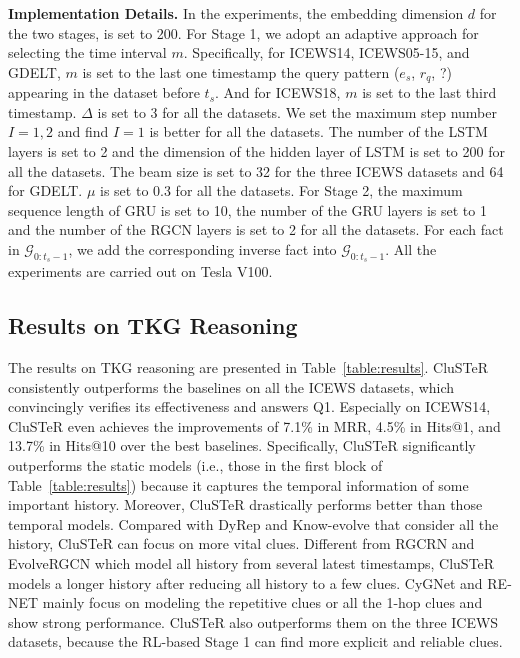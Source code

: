 \documentclass[11pt,a4paper]{article}
\begin{document}
{\bf Implementation Details.}  In the experiments, the embedding dimension $d$
for the two stages, is set to 200. For Stage 1, we adopt an adaptive approach for
selecting the time interval $m$. Specifically, for ICEWS14, ICEWS05-15, and
GDELT, $m$ is set to the last one timestamp the query pattern ($e_s$, $r_q$, ?)
appearing in the dataset before $t_s$. And for ICEWS18, $m$ is set to the last
third timestamp. $\Delta$ is set to 3 for all the datasets. We set the maximum
step number $I={1,2}$ and find $I=1$ is better for all the datasets. The number
of the LSTM layers is set to 2 and the dimension of the hidden layer of LSTM is
set to 200 for all the datasets. The beam size is set to 32 for the three ICEWS
datasets and 64 for GDELT. $\mu$ is set to 0.3 for all the datasets. For Stage
2, the maximum sequence length of GRU is set to 10, the number of
the GRU layers is set to 1 and the number of the RGCN layers is set to 2 for all the 
datasets. For each fact in $\mathcal{G}_{0:t_s-1}$, we add the corresponding
inverse fact into $\mathcal{G}_{0:t_s-1}$. All the experiments are carried out on Tesla V100.

\subsection{Results on TKG Reasoning}\label{Experimental Results} The results on
TKG reasoning are presented in Table~\ref{table:results}. CluSTeR consistently
outperforms the baselines on all the ICEWS datasets, which convincingly verifies
its effectiveness and answers Q1. Especially on ICEWS14, CluSTeR even
achieves the improvements of 7.1\% in MRR, 4.5\% in Hits@1, and 13.7\% in
Hits@10 over the best baselines. Specifically, CluSTeR significantly outperforms
the static models (i.e., those in the first block of Table~\ref{table:results})
because it captures the temporal information of some important history.
Moreover, CluSTeR drastically performs better than those temporal models.
Compared with DyRep and Know-evolve that consider all the history, CluSTeR can
focus on more vital clues. Different from RGCRN and EvolveRGCN which model all
history from several latest timestamps, CluSTeR models a longer history after
reducing all history to a few clues.
CyGNet and RE-NET mainly focus on modeling the repetitive clues or all the
1-hop clues and show strong performance. CluSTeR also outperforms them on the three ICEWS
datasets, because the RL-based Stage 1 can find more explicit and reliable
clues. 
\end{document}
